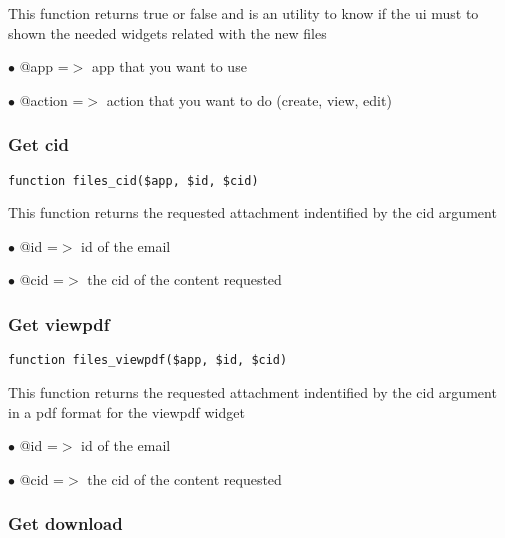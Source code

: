 \documentclass[a4paper]{article}
\begin{document}
This function returns true or false and is an utility to know if the ui
must to shown the needed widgets related with the new files

\begin{compactitem}
\item[\color{myblue}$\bullet$] @app    =$>$ app that you want to use
\item[\color{myblue}$\bullet$] @action =$>$ action that you want to do (create, view, edit)
\end{compactitem}

\hypertarget{toc449}{}
\subsubsection{Get cid}

\begin{lstlisting}
function files_cid($app, $id, $cid)
\end{lstlisting}

This function returns the requested attachment indentified by the cid argument

\begin{compactitem}
\item[\color{myblue}$\bullet$] @id  =$>$ id of the email
\item[\color{myblue}$\bullet$] @cid =$>$ the cid of the content requested
\end{compactitem}

\hypertarget{toc450}{}
\subsubsection{Get viewpdf}

\begin{lstlisting}
function files_viewpdf($app, $id, $cid)
\end{lstlisting}

This function returns the requested attachment indentified by the cid argument
in a pdf format for the viewpdf widget

\begin{compactitem}
\item[\color{myblue}$\bullet$] @id  =$>$ id of the email
\item[\color{myblue}$\bullet$] @cid =$>$ the cid of the content requested
\end{compactitem}

\hypertarget{toc451}{}
\subsubsection{Get download}
\end{document}
